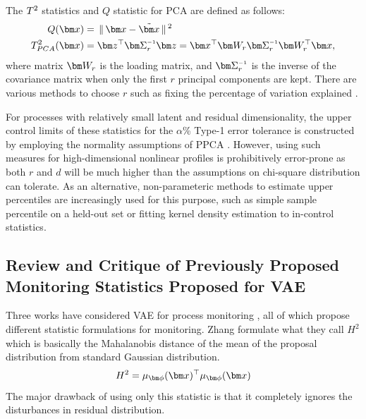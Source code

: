 \documentclass[journal, peerreview]{IEEEtran}
\begin{document}
The $ T^{2} $ statistics and $ Q $ statistic for PCA are defined as follows:
\begin{equation}
\begin{split}
	Q(\mbx) &= \gg \mbx - \tilde{\mbx} \gg^2 \\
	\Tsq_{PCA}(\mbx) &= \mbz^\top \mbSigma\inv_{r} \mbz = \mbx^\top \mbW_{r} \mbSigma\inv_{r} \mbW^\top_{r} \mbx,
\end{split}
\label{eqn: QTPCA}
\end{equation}
where matrix $ \mbW_{r} $ is the loading matrix, and $ \mbSigma\inv_{r} $ is the inverse of the covariance matrix when only the first $r$ principal components are kept. 
There are various methods to choose $r$ such as fixing the percentage of variation explained \cite[p. 41]{Chiang2001-nu}.

For processes with relatively small latent and residual dimensionality, the upper control limits of these statistics for the $\alpha$\% Type-1 error tolerance is constructed by employing the normality assumptions of PPCA \cite[p. 43-44]{Chiang2001-nu}.
However, using such measures for high-dimensional nonlinear profiles is prohibitively error-prone as both $r$ and $d$ will be much higher than the assumptions on chi-square distribution can tolerate.
As an alternative, non-parameteric methods to estimate upper percentiles are increasingly used for this purpose, such as simple sample percentile on a held-out set or fitting kernel density estimation to in-control statistics.

\subsection{Review and Critique of Previously Proposed Monitoring Statistics Proposed for VAE}
\label{sec:bckgrnd:critique}
Three works have considered VAE for process monitoring \cite{wang2019systematic, Zhang2019-lu, lee2019process}, all of which propose different statistic formulations for monitoring.
Zhang \etal \cite{Zhang2019-lu} formulate what they call $H^2$ which is basically the Mahalanobis distance of the mean of the proposal distribution from standard Gaussian distribution.
\begin{equation}
    H^2 = \mu_{\mbphi}(\mbx)^{\top}\mu_{\mbphi}(\mbx)
\end{equation}
The major drawback of using only this statistic is that it completely ignores the disturbances in residual distribution.
\end{document}
